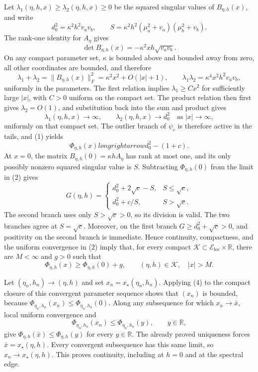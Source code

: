 Let \(\lambda_1(\eta,h,x)\geq\lambda_2(\eta,h,x)\geq0\) be the squared singular values of \(B_{\eta,h}(x)\), and write
\[
 d_0^2=\kappa^2h^2v_av_b,
 \qquad
 S=\kappa^2h^2(\mu_a^2+v_a)(\mu_b^2+v_b).
\]
The rank-one identity for \(A_\eta\) gives
\[
 \det B_{\eta,h}(x)=-\kappa^2xh\sqrt{v_av_b}.
\]
On any compact parameter set, \(\kappa\) is bounded above and bounded away from zero, all other coordinates are bounded, and therefore
\[
 \lambda_1+\lambda_2
 =\|B_{\eta,h}(x)\|_F^2
 =\kappa^2x^2+O(|x|+1),
 \qquad
 \lambda_1\lambda_2=\kappa^4x^2h^2v_av_b,
\]
uniformly in the parameters.  The first relation implies \(\lambda_1\geq Cx^2\) for sufficiently large \(|x|\), with \(C>0\) uniform on the compact set.  The product relation then first gives \(\lambda_2=O(1)\), and substitution back into the sum and product gives
\[
 \lambda_1(\eta,h,x)\longrightarrow\infty,
 \qquad
 \lambda_2(\eta,h,x)\longrightarrow d_0^2
 \quad\text{as }|x|\longrightarrow\infty, \tag{1}
\]
uniformly on that compact set.  The outlier branch of \(\psi_c\) is therefore active in the tails, and (1) yields
\[
 \Phi_{\eta,h}(x)longrightarrow d_0^2-(1+c). \tag{2}
\]
At \(x=0\), the matrix \(B_{\eta,h}(0)=\kappa hA_\eta\) has rank at most one, and its only possibly nonzero squared singular value is \(S\).  Subtracting \(\Phi_{\eta,h}(0)\) from the limit in (2) gives
\[
 G(\eta,h)=
 \begin{cases}
 d_0^2+2\sqrt c-S,&S\leq\sqrt c,\\
 d_0^2+c/S,&S>\sqrt c.
 \end{cases} \tag{3}
\]
The second branch uses only \(S>\sqrt c>0\), so its division is valid.  The two branches agree at \(S=\sqrt c\).  Moreover, on the first branch \(G\geq d_0^2+\sqrt c>0\), and positivity on the second branch is immediate.  Hence continuity, compactness, and the uniform convergence in (2) imply that, for every compact \(\mathcal K\subset\mathcal E_{\mathrm{loc}}\times\mathbb R\), there are \(M<\infty\) and \(g>0\) such that
\[
 \Phi_{\eta,h}(x)\geq\Phi_{\eta,h}(0)+g,
 \qquad (\eta,h)\in\mathcal K,\quad |x|>M. \tag{4}
\]

Let \((\eta_n,h_n)\to(\eta,h)\) and set \(x_n=x_\star(\eta_n,h_n)\).  Applying (4) to the compact closure of this convergent parameter sequence shows that \((x_n)\) is bounded, because \(\Phi_{\eta_n,h_n}(x_n)\leq\Phi_{\eta_n,h_n}(0)\).  Along any subsequence for which \(x_n\to\bar x\), local uniform convergence and
\[
 \Phi_{\eta_n,h_n}(x_n)\leq\Phi_{\eta_n,h_n}(y),
 \qquad y\in\mathbb R,
\]
give \(\Phi_{\eta,h}(\bar x)\leq\Phi_{\eta,h}(y)\) for every \(y\in\mathbb R\).  The already proved uniqueness forces \(\bar x=x_\star(\eta,h)\).  Every convergent subsequence has this same limit, so \(x_n\to x_\star(\eta,h)\).  This proves continuity, including at \(h=0\) and at the spectral edge.

